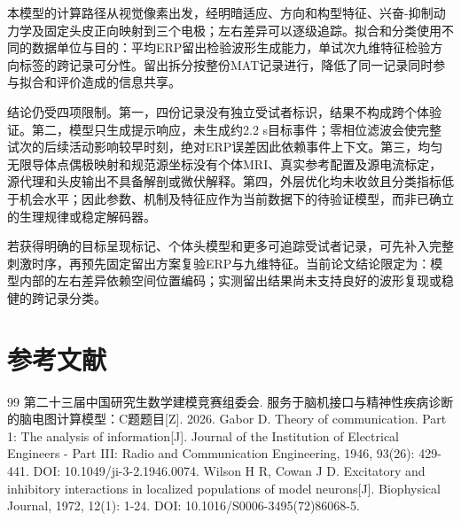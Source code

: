 本模型的计算路径从视觉像素出发，经明暗适应、方向和构型特征、兴奋-抑制动力学及固定头皮正向映射到三个电极；左右差异可以逐级追踪。拟合和分类使用不同的数据单位与目的：平均ERP留出检验波形生成能力，单试次九维特征检验方向标签的跨记录可分性。留出拆分按整份MAT记录进行，降低了同一记录同时参与拟合和评价造成的信息共享。

结论仍受四项限制。第一，四份记录没有独立受试者标识，结果不构成跨个体验证。第二，模型只生成提示响应，未生成约2.2 s目标事件；零相位滤波会使完整试次的后续活动影响较早时刻，绝对ERP误差因此依赖事件上下文。第三，均匀无限导体点偶极映射和规范源坐标没有个体MRI、真实参考配置及源电流标定，源代理和头皮输出不具备解剖或微伏解释。第四，外层优化均未收敛且分类指标低于机会水平；因此参数、机制及特征应作为当前数据下的待验证模型，而非已确立的生理规律或稳定解码器。

若获得明确的目标呈现标记、个体头模型和更多可追踪受试者记录，可先补入完整刺激时序，再预先固定留出方案复验ERP与九维特征。当前论文结论限定为：模型内部的左右差异依赖空间位置编码；实测留出结果尚未支持良好的波形复现或稳健的跨记录分类。

\clearpage

\hypertarget{ux53c2ux8003ux6587ux732e}{%
\section{参考文献}\label{ux53c2ux8003ux6587ux732e}}

\renewcommand{\refname}{}
\begin{thebibliography}{99}
\setlength{\itemsep}{2pt}
 第二十三届中国研究生数学建模竞赛组委会. 服务于脑机接口与精神性疾病诊断的脑电图计算模型：C题题目[Z]. 2026.
 Gabor D. Theory of communication. Part 1: The analysis of information[J]. Journal of the Institution of Electrical Engineers - Part III: Radio and Communication Engineering, 1946, 93(26): 429-441. DOI: 10.1049/ji-3-2.1946.0074.
 Wilson H R, Cowan J D. Excitatory and inhibitory interactions in localized populations of model neurons[J]. Biophysical Journal, 1972, 12(1): 1-24. DOI: 10.1016/S0006-3495(72)86068-5.
\end{thebibliography}
